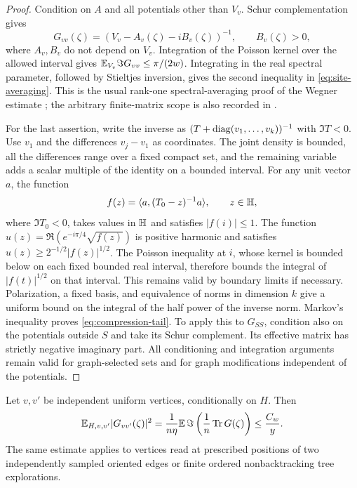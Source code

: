 \begin{proof}
Condition on $A$ and all potentials other than $V_v$.  Schur complementation
gives
\begin{equation}\label{eq:intercept}
 G_{vv}(\zeta)=(V_v-A_v(\zeta)-iB_v(\zeta))^{-1},
 \qquad B_v(\zeta)>0,
\end{equation}
where $A_v,B_v$ do not depend on $V_v$.  Integration of the Poisson
kernel over the allowed interval gives
$\mathbb E_{V_v}\Im G_{vv}\le\pi/(2w)$.  Integrating in the real spectral
parameter, followed by Stieltjes inversion, gives the second inequality
in \eqref{eq:site-averaging}.  This is the usual rank-one spectral-averaging
proof of the Wegner estimate \cite{Wegner1981}; the arbitrary finite-matrix
scope is also recorded in \cite[Lemma~3.2]{AizenmanWarzel2009}.

For the last assertion, write the inverse as
$(T+\operatorname{diag}(v_1,\ldots,v_k))^{-1}$ with $\Im T<0$.  Use $v_1$ and the
differences $v_j-v_1$ as coordinates.  The joint density is bounded,
all the differences range over a fixed compact set, and the remaining
variable adds a scalar multiple of the identity on a bounded interval.
For any unit vector $a$, the function
\[
 f(z)=\langle a,(T_0-z)^{-1}a\rangle,\qquad z\in\mathbb H,
\]
where $\Im T_0<0$, takes values in $\mathbb H$ and satisfies $|f(i)|\le1$.
The function
$u(z)=\Re(e^{-i\pi/4}\sqrt{f(z)})$ is positive harmonic and satisfies
$u(z)\ge2^{-1/2}|f(z)|^{1/2}$.  The Poisson inequality at $i$, whose
kernel is bounded below on each fixed bounded real interval, therefore
bounds the integral of $|f(t)|^{1/2}$ on that interval.  This remains
valid by boundary limits if necessary.  Polarization, a fixed basis,
and equivalence of norms in dimension $k$ give a uniform bound on the
integral of the half power of the inverse norm.  Markov's inequality
proves \eqref{eq:compression-tail}.  To apply this to $G_{SS}$, condition
also on the potentials outside $S$ and take its Schur complement.  Its
effective matrix has strictly negative imaginary part.  All conditioning
and integration arguments remain valid for graph-selected sets and for
graph modifications independent of the potentials.
\end{proof}

\begin{lemma}
\label{lem:ward}
Let $v,v'$ be independent uniform vertices, conditionally on $H$.  Then
\begin{equation}\label{eq:sampled-ward}
 \mathbb E_{H,v,v'}|G_{vv'}(\zeta)|^2
 =\frac1{n\eta}\mathbb E\,\Im\left(\frac1n\operatorname{Tr} G(\zeta)\right)
 \le\frac{C_w}{y}.
\end{equation}
The same estimate applies to vertices read at prescribed positions of
two independently sampled oriented edges or finite ordered
nonbacktracking tree explorations.
\end{lemma}

